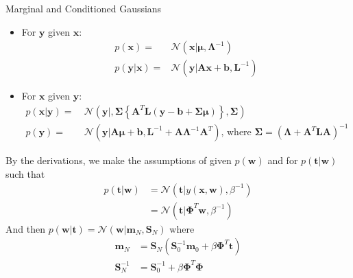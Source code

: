 
\begin{frame}{\insertsubsection}

\begin{block}{Marginal and Conditioned Gaussians}

\begin{itemize}
\item \textcolor{UniGold}{For $\mathbf{y}$ given $\mathbf{x}$:}
\begin{align*}
	p\left( \mathbf{x} \right) =& \mathcal{N} \left( \mathbf{x}|\boldsymbol{\mu}, \boldsymbol{\Lambda}^{-1} \right) \\
	p\left( \mathbf{y} | \mathbf{x} \right) =& \mathcal{N} \left( \mathbf{y}|\mathbf{Ax}+\mathbf{b}, \mathbf{L}^{-1} \right)
\end{align*}

\item \textcolor{UniGold}{For $\mathbf{x}$ given $\mathbf{y}$:}
\begin{align*}
p\left( \mathbf{x} | \mathbf{y} \right) =& \ \mathcal{N}\left( \mathbf{y}| ,  \boldsymbol{\Sigma} \left\{ \mathbf{A}^T \mathbf{L}(\mathbf{y}-\mathbf{b} + \boldsymbol{\Sigma \mu}) \right\}, \boldsymbol{\Sigma} \right) \\
p\left( \mathbf{y} \right) =& \ \mathcal{N}\left( \mathbf{y}|\mathbf{A} \boldsymbol{\mu} + \mathbf{b}, \mathbf{L}^{-1} + \mathbf{A}\boldsymbol{\Lambda}^{-1}\mathbf{A}^T \right) \text{, where } \boldsymbol{\Sigma} = \left(  \boldsymbol{\Lambda} + \mathbf{A}^T \mathbf{LA} \right)^{-1}
\end{align*}
\end{itemize}

\end{block}
\end{frame}

\begin{frame}{\insertsubsection}
	By the derivations, we make the assumptions of given $p(\mathbf{w})$ and  for $p(\mathbf{t}|\mathbf{w})$ such that 
	\begin{align*}
		p(\mathbf{t}|\mathbf{w}) &= \mathcal{N}\left( \mathbf{t}|y(\mathbf{x},\mathbf{w}), \beta^{-1} \right)	\\
		&= \mathcal{N}\left( \mathbf{t}|\boldsymbol{\Phi}^T\mathbf{w}, \beta^{-1} \right)
	\end{align*}
	And then $p(\mathbf{w}|\mathbf{t}) = \mathcal{N}\left( \mathbf{w}|\mathbf{m}_N, \mathbf{S}_N \right)$ where
	\begin{align*}
		\mathbf{m}_N &= \mathbf{S}_N \left( \mathbf{S}_0^{-1}\mathbf{m}_0 + \beta \boldsymbol{\Phi}^T\mathbf{t}  \right) \\
		\mathbf{S}_N^{-1} &= \mathbf{S}_0^{-1} + \beta\boldsymbol{\Phi}^T\boldsymbol{\Phi}
	\end{align*}
\end{frame}

